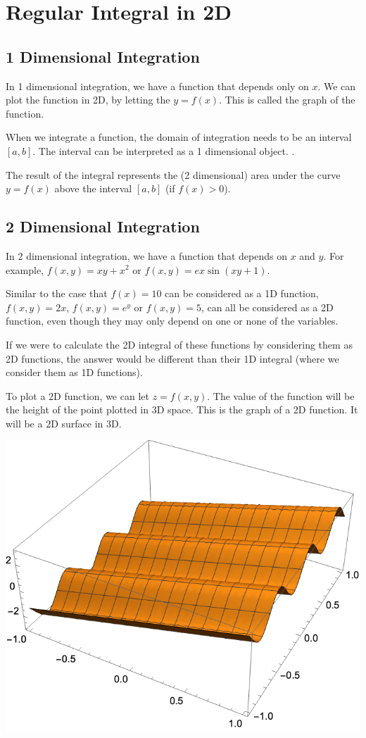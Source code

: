 \documentclass[11pt,fleqn]{book} %
\begin{document}
\section{Regular Integral in 2D}

\subsection*{1 Dimensional Integration}

In 1 dimensional integration, we have a function that depends only on $x$. We can plot the function in 2D, by letting the $y = f(x)$. This is called the graph of the function.

When we integrate a function, the domain of integration needs to be an interval $[a, b]$. The interval can be interpreted as a 1 dimensional object. .

The result of the integral represents the (2 dimensional) area under the curve $y = f(x)$ above the interval $[a, b]$ (if $f(x) > 0$).

\subsection*{2 Dimensional Integration}

In 2 dimensional integration, we have a function that depends on $x$ and $y$. For example, $f(x, y) = xy + x^2$ or $f(x, y) = e x \sin(xy + 1)$. 

Similar to the case that $f(x) = 10$ can be considered as a 1D function, $f(x, y) = 2x$, $f(x, y) = e^y$ or $f(x, y) = 5$, can all be considered as a 2D function, even though they may only depend on one or none of the variables.

If we were to calculate the 2D integral of these functions by considering them as 2D functions, the answer would be different than their 1D integral (where we consider them as 1D functions).

To plot a 2D function, we can let $z = f(x, y)$. The value of the function will be the height of the point plotted in 3D space. This is the graph of a 2D function. It will be a 2D surface in 3D.

\begin{center} \includegraphics[width=0.275\linewidth]{Plots/s_4_1/sin(y)+2x.png} \end{center}
\end{document}
